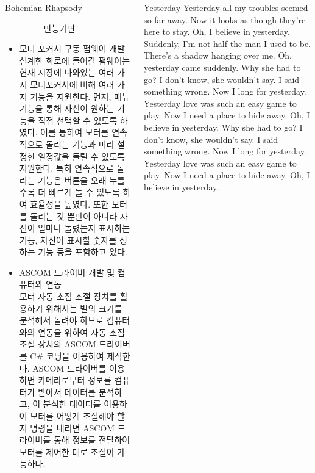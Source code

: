 \documentclass{gshs_poster_beamer}
\begin{document}
\begin{columns}[T]
\begin{posterbox}[colbacktitle=black,coltitle=white,colback=black!5]{Bohemian Rhapsody}
\begin{itemize}
\begin{figure}[h]
		\caption{만능기판}
		\label{fig:circuit1}
	\end{figure}
	\item 모터 포커서 구동 펌웨어 개발\\
	설계한 회로에 들어갈 펌웨어는 현재 시장에 나와있는 여러 가지 모터포커서에 비해 여러 가지 기능을 지원한다. 먼저, 메뉴 기능을 통해 자신이 원하는 기능을 직접 선택할 수 있도록 하였다. 이를 통하여 모터를 연속적으로 돌리는 기능과 미리 설정한 일정값을 돌릴 수 있도록 지원한다. 특히 연속적으로 돌리는 기능은 버튼을 오래 누를수록 더 빠르게 돌 수 있도록 하여 효율성을 높였다. 또한 모터를 돌리는 것 뿐만이 아니라 자신이 얼마나 돌렸는지 표시하는 기능, 자신이 표시할 숫자를 정하는 기능 등을 포함하고 있다.
	\item ASCOM 드라이버 개발 및 컴퓨터와 연동\\
	모터 자동 초점 조절 장치를 활용하기 위해서는 별의 크기를 분석해서 돌려야 하므로 컴퓨터와의 연동을 위하여 자동 초점 조절 장치의 ASCOM 드라이버를 C\# 코딩을 이용하여 제작한다. ASCOM 드라이버를 이용하면 카메라로부터 정보를 컴퓨터가 받아서 데이터를 분석하고, 이 분석한 데이터를 이용하여 모터를 어떻게 조절해야 할지 명령을 내리면 ASCOM 드라이버를 통해 정보를 전달하여 모터를 제어한 대로 조절이 가능하다.
  \end{itemize}
\end{posterbox}

\begin{posterbox}[colbacktitle=blue!50!black,coltitle=white,colback=cyan!5]{Yesterday}
Yesterday all my troubles seemed so far away. Now it looks as though they're here to stay. Oh, I believe in yesterday. Suddenly, I'm not half the man I used to be.
There's a shadow hanging over me.
Oh, yesterday came suddenly. Why she had to go?
I don't know, she wouldn't say.
I said something wrong.
Now I long for yesterday. Yesterday love was such an easy game to play.
Now I need a place to hide away.
Oh, I believe in yesterday. Why she had to go?
I don't know, she wouldn't say.
I said something wrong.
Now I long for yesterday. Yesterday love was such an easy game to play.
Now I need a place to hide away.
Oh, I believe in yesterday.
\end{posterbox}


\end{columns}
\end{document}
